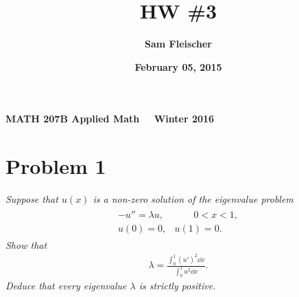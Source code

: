 \documentclass[12pt]{article}
\title{\bf HW \#3}
\author{\bf Sam Fleischer}
\date{\bf February 05, 2015}
\theoremstyle{plain}
\begin{document}
\textbf{MATH 207B \hfill Applied Math \ \ \hfill Winter 2016\ \ \ }

{\let\newpage\relax\maketitle}

\section*{Problem 1}
\emph{Suppose that $u(x)$ is a non-zero solution of the eigenvalue problem}
\begin{align*}
    \begin{array}{rr}
        -u'' = \lambda u, &\qquad 0 < x < 1,\\
        u(0) = 0, & u(1) = 0.
    \end{array}
\end{align*}
\emph{Show that}
\begin{align*}
    \lambda = \frac{\int_0^1 (u')^2 \dd x}{\int_0^1 u^2 \dd x}.
\end{align*}
\emph{Deduce that every eigenvalue $\lambda$ is strictly positive.}
\end{document}
